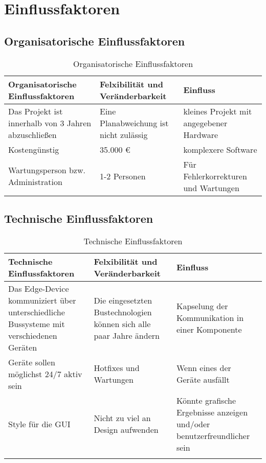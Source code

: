 \chapter{Einflussfaktoren}
\label{ch:Einflussfaktoren}

\section{Organisatorische Einflussfaktoren}
\begin{table}[h]
    \caption{Organisatorische Einflussfaktoren}
    \begin{tabular}{|p{5cm}|p{5cm}|p{5cm}|}
        \toprule
        Organisatorische Einflussfaktoren 
        & 
        Felxibilität und Veränderbarkeit 
        & 
        Einfluss \\
        \toprule
        Das Projekt ist innerhalb von 3 Jahren abzuschließen
        &
        Eine Planabweichung ist nicht zulässig
        &
        kleines Projekt mit angegebener Hardware
        \\
        \midrule
        Kostengünstig
        &
        35.000 €
        &
        komplexere Software
        \\
        \midrule
        Wartungsperson bzw. Administration
        &
        1-2 Personen
        &
        Für Fehlerkorrekturen und Wartungen \\
        \bottomrule
    \end{tabular}
    \label{tab:EinflussOrga}
\end{table}


\section{Technische Einflussfaktoren}
\begin{table}[h]
    \caption{Technische Einflussfaktoren}
    \begin{tabular}{|p{5cm}|p{5cm}|p{5cm}|}
        \toprule
        Technische Einflussfaktoren 
        & 
        Felxibilität und Veränderbarkeit 
        & 
        Einfluss \\
        \toprule
        Das Edge-Device kommuniziert über unterschiedliche Bussysteme mit verschiedenen Geräten
        &
        Die eingesetzten Bustechnologien können sich alle paar Jahre ändern
        &
        Kapselung der Kommunikation in einer Komponente
        \\
        \midrule
        Geräte sollen möglichst 24/7 aktiv sein
        &
        Hotfixes und Wartungen
        &
        Wenn eines der Geräte ausfällt
        \\
        \midrule
        Style für die GUI
        &
        Nicht zu viel an Design aufwenden
        &
        Könnte grafische Ergebnisse anzeigen und/oder benutzerfreundlicher sein\\
        \\
        \bottomrule
    \end{tabular}
    \label{tab:EinflussTechnisch}
\end{table}